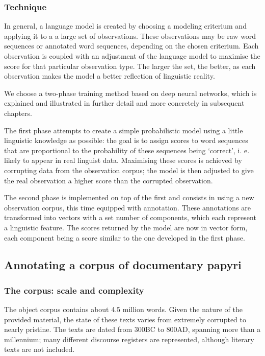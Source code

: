 \subsubsection{Technique} 
In general, a language model is created by choosing a modeling
criterium and applying it to a a large set of observations. These
observations may be raw word sequences or annotated word sequences,
depending on the chosen criterium. Each observation is coupled with an
adjustment of the language model to maximise the score for that
particular observation type. The larger the set, the better, as each
observation makes the model a better reflection of linguistic reality.

We choose a two-phase training method based on deep neural networks,
which is explained and illustrated in further detail and more
concretely in subsequent chapters.

The first phase attempts to create a simple probabilistic model using
a little linguistic knowledge as possible: the goal is to assign
scores to word sequences that are proportional to the probability of
these sequences being `correct', i. e. likely to appear in real
linguist data. Maximising these scores is achieved by corrupting data
from the observation corpus; the model is then adjusted to give the
real observation a higher score than the corrupted observation.

The second phase is implemented on top of the first and consists in
using a new observation corpus, this time equipped with
annotation. These annotations are transformed into vectors with a set
number of components, which each represent a linguistic feature. The
scores returned by the model are now in vector form, each component
being a score similar to the one developed in the first phase.


\subsection{Annotating a corpus of documentary papyri}
\subsubsection{The corpus: scale and complexity}
The object corpus contains about 4.5 million words. Given the nature
of the provided material, the state of these texts varies from
extremely corrupted to nearly pristine. The texts are dated from 300BC
to 800AD, spanning more than a millennium; many different discourse
registers are represented, although literary texts are not included.

